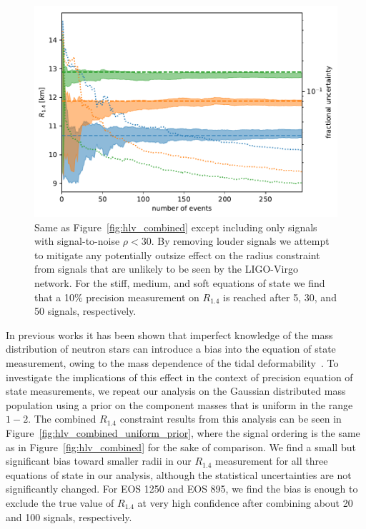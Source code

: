 \begin{figure}[ht]
\includegraphics[width=\textwidth]{Figures/eos-meas/final_pop_hlv_combined_radius_3eos_gaussian_prior_seed0_bw0p3_snr_lt_30.pdf}
\caption{Same as Figure~\ref{fig:hlv_combined} except including only signals with signal-to-noise $\rho<30$. By removing louder signals we attempt to mitigate any potentially outsize effect on the radius constraint from signals that are unlikely to be seen by the LIGO-Virgo network. For the stiff, medium, and soft equations of state we find that a 10\% precision measurement on $R_{1.4}$ is reached after 5, 30, and 50 signals, respectively.}
\label{fig:hlv_combined_snr_lt_30}
\end{figure}

In previous works it has been shown that imperfect knowledge of the mass distribution of neutron stars can introduce a bias into the equation of state measurement, owing to the mass dependence of the tidal deformability~\cite{Agathos:2015uaa,Wysocki:2020myz}. To investigate the implications of this effect in the context of precision equation of state measurements, we repeat our analysis on the Gaussian distributed mass population using a prior on the component masses that is uniform in the range $1-2$\msun. The combined $R_{1.4}$ constraint results from this analysis can be seen in Figure~\ref{fig:hlv_combined_uniform_prior}, where the signal ordering is the same as in Figure~\ref{fig:hlv_combined} for the sake of comparison. We find a small but significant bias toward smaller radii in our $R_{1.4}$ measurement for all three equations of state in our analysis, although the statistical uncertainties are not significantly changed. For EOS 1250 and EOS 895, we find the bias is enough to exclude the true value of $R_{1.4}$ at very high confidence after combining about 20 and 100 signals, respectively.

